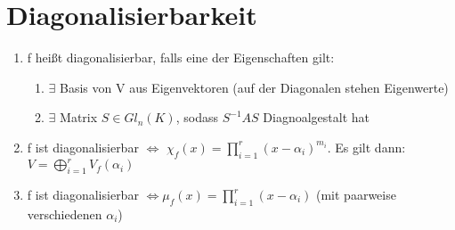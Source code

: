 \section{Diagonalisierbarkeit}
\begin{theorem}
\leavevmode
\begin{enumerate}
	\item f heißt diagonalisierbar, falls eine der Eigenschaften gilt:
	\begin{enumerate}
		\item $\exists$ Basis von V aus Eigenvektoren (auf der Diagonalen stehen Eigenwerte)
		\item $\exists$ Matrix $S \in Gl_n(K)$, sodass $S^{-1}AS$ Diagnoalgestalt hat
	\end{enumerate}
	\item f ist diagonalisierbar $\Leftrightarrow$ $\chi_f(x) = \prod \limits_{i=1}^{r} (x- \alpha_i)^{m_i}$. Es gilt dann: $V=\bigoplus \limits_{i=1}^r V_f(\alpha_i)$
	\item f ist diagonalisierbar $\Leftrightarrow \mu_f(x) = \prod \limits_{i=1}^{r}(x-\alpha_i)$ (mit paarweise verschiedenen $\alpha_i$) 
\end{enumerate}
\end{theorem}

